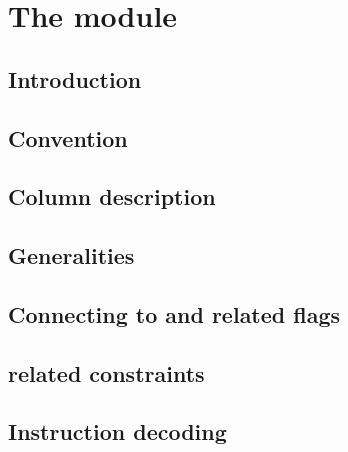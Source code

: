 
\section{The \romMod{} module}                                   \label{rom}
\subsection{Introduction}                                        \label{rom: intro}                        
\subsection{Convention}                                          \label{rom: convention}                   
\subsection{Column description}                                  \label{rom: columns}                      
\subsection{Generalities}                                        \label{rom: constraints}                  
\subsection{Connecting \pbcb{} to \opc{} and related flags}      \label{rom: opcode related constraints}   
\subsection{ related constraints}                     \label{rom: push related constraints}     
\subsection{Instruction decoding}                                \label{rom: instruction decoding}         
